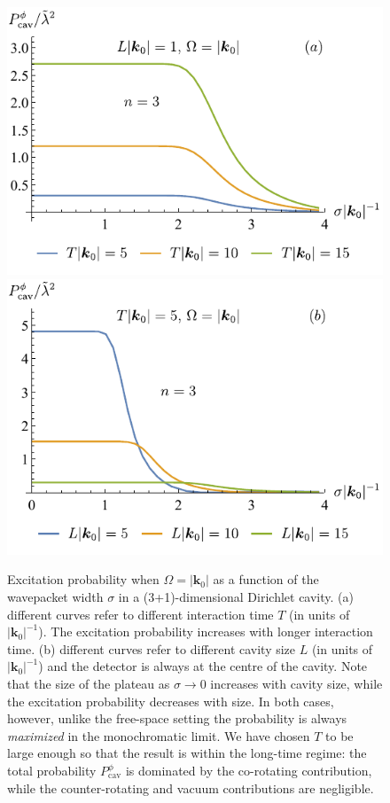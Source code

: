 \documentclass[prd,twocolumn,superscriptaddress,nofootinbib,floatfix,amsmath,amssymb]{revtex4-2}
\newcommand{\bk}{{\bm{k}}}
\begin{document}
    \begin{figure}[htp]
        \centering
        \includegraphics[scale=0.95]{Fig2a.pdf}
        \includegraphics[scale=0.95]{Fig2b.pdf}
        \caption{Excitation probability when $\Omega=|\bk_0|$ as a function of the wavepacket width $\sigma$ in a (3+1)-dimensional Dirichlet cavity. {(a)} different curves refer to different interaction time $T$ (in units of $|\bk_0|^{-1}$). The excitation probability increases with longer interaction time. {(b)} different curves refer to different cavity size $L$ (in units of $|\bk_0|^{-1}$) and the detector is always at the centre of the cavity. Note that the size of the plateau as $\sigma\to 0$ increases with cavity size, while the excitation probability decreases with size. In both cases, however, unlike the free-space setting the probability is always \textit{maximized} in the monochromatic limit. We have chosen $T$ to be large enough so that the result is within the long-time regime: the total probability $P_{\text{cav}}^\phi$ is dominated by the co-rotating contribution, while the counter-rotating and vacuum contributions are negligible. }
        \label{fig: resonant-cavity-peak-limit}
    \end{figure}
\end{document}
